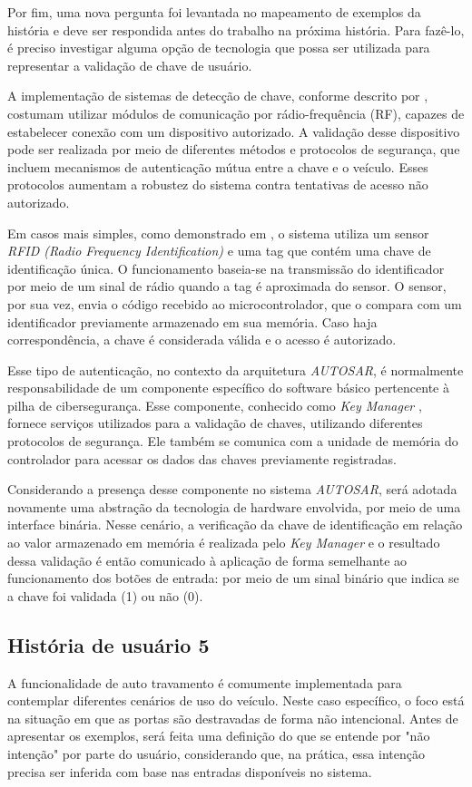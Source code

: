 Por fim, uma nova pergunta foi levantada no mapeamento de exemplos da história e deve ser respondida antes do trabalho na próxima história. Para fazê-lo, é 
preciso investigar alguma opção de tecnologia que possa ser utilizada para representar a validação de chave de usuário. 

A implementação de sistemas de detecção de chave, conforme descrito por , costumam utilizar módulos de comunicação por rádio-frequência (RF), 
capazes de estabelecer conexão com um dispositivo autorizado. A validação desse dispositivo pode ser realizada por meio de diferentes métodos e protocolos de segurança, 
que incluem mecanismos de autenticação mútua entre a chave e o veículo. Esses protocolos aumentam a robustez do sistema contra tentativas de acesso não autorizado.

Em casos mais simples, como demonstrado em , o sistema utiliza um sensor \textit{RFID (Radio Frequency Identification)} e uma tag que contém uma chave 
de identificação única. O funcionamento baseia-se na transmissão do identificador por meio de um sinal de rádio quando a tag é aproximada do sensor. O sensor, 
por sua vez, envia o código recebido ao microcontrolador, que o compara com um identificador previamente armazenado em sua memória. Caso haja correspondência, 
a chave é considerada válida e o acesso é autorizado.

Esse tipo de autenticação, no contexto da arquitetura \textit{AUTOSAR}, é normalmente responsabilidade de um componente específico do software básico pertencente 
à pilha de cibersegurança. Esse componente, conhecido como \textit{Key Manager} \cite{autosarKeyManager}, fornece serviços utilizados para a validação de chaves, 
utilizando diferentes protocolos de segurança. Ele também se comunica com a unidade de memória do controlador para acessar os dados das chaves previamente registradas.

Considerando a presença desse componente no sistema \textit{AUTOSAR}, será adotada novamente uma abstração da tecnologia de hardware envolvida, por meio de uma interface 
binária. Nesse cenário, a verificação da chave de identificação em relação ao valor armazenado em memória é realizada pelo \textit{Key Manager} e o resultado dessa 
validação é então comunicado à aplicação de forma semelhante ao funcionamento dos botões de entrada: por meio de um sinal binário que indica se a chave foi 
validada (1) ou não (0).

\subsection{História de usuário 5}
A funcionalidade de auto travamento é comumente implementada para contemplar diferentes cenários de uso do veículo. Neste caso específico, o foco está na situação em 
que as portas são destravadas de forma não intencional. Antes de apresentar os exemplos, será feita uma definição do que se entende por "não intenção" por parte do 
usuário, considerando que, na prática, essa intenção precisa ser inferida com base nas entradas disponíveis no sistema. 

